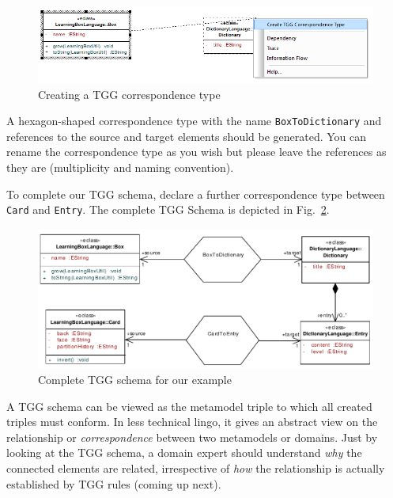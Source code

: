 \begin{figure}[htbp]
\begin{center}
  \includegraphics[width=\textwidth]{pics/tggBilder/tggSchema/tgg5}
  \caption{Creating a TGG correspondence type} 
  \label{fig:create_correspondence}
\end{center}
\end{figure}

A hexagon-shaped correspondence type with the name \texttt{BoxToDiction\-ary} and references to the source and target elements should be generated.
You can rename the correspondence type as you wish but please leave the references as they are (multiplicity and naming convention).

To complete our TGG schema, declare a further correspondence type between \texttt{Card} and \texttt{Entry}.
The complete TGG Schema is depicted in Fig.~\ref{fig:complete_tgg_schema}.

\begin{figure}[htbp]
\begin{center}
  \includegraphics[width=\textwidth]{pics/tggBilder/tggSchema/tgg7}
  \caption{Complete TGG schema for our example}
  \label{fig:complete_tgg_schema}
\end{center}
\end{figure}

A TGG schema can be viewed as the metamodel triple to which all created triples must conform.
In less technical lingo, it gives an abstract view on the relationship or \emph{correspondence} between two metamodels or domains.
Just by looking at the TGG schema, a domain expert should understand \emph{why} the connected elements are related, irrespective of \emph{how} the relationship is actually established by TGG rules (coming up next).
